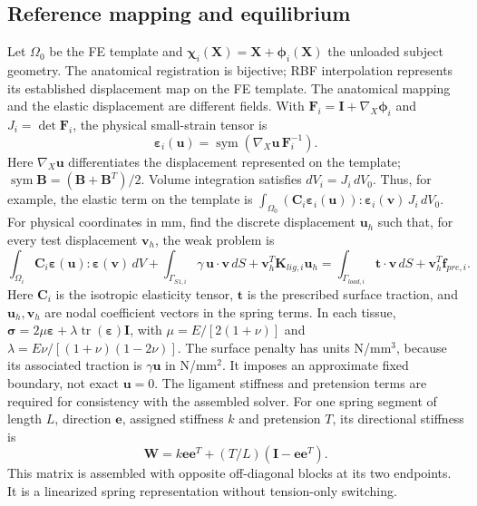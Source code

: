 \subsection{Reference mapping and equilibrium}
Let $\Omega_0$ be the FE template and $\boldsymbol\chi_i(\mathbf X)=\mathbf X+\boldsymbol\phi_i(\mathbf X)$ the unloaded subject geometry. The anatomical registration is bijective; RBF interpolation represents its established displacement map on the FE template. The anatomical mapping and the elastic displacement are different fields. With $\mathbf F_i=\mathbf I+\nabla_X\boldsymbol\phi_i$ and $J_i=\det\mathbf F_i$, the physical small-strain tensor is
\begin{equation}
\boldsymbol\varepsilon_i(\mathbf u)=\operatorname{sym}(\nabla_X\mathbf u\,\mathbf F_i^{-1}).
\end{equation}
Here $\nabla_X\mathbf u$ differentiates the displacement represented on the template; $\operatorname{sym}\mathbf B=(\mathbf B+\mathbf B^T)/2$. Volume integration satisfies $dV_i=J_i\,dV_0$. Thus, for example, the elastic term on the template is $\int_{\Omega_0}(\mathbf C_i\boldsymbol\varepsilon_i(\mathbf u)): \boldsymbol\varepsilon_i(\mathbf v)\,J_i\,dV_0$. For physical coordinates in mm, find the discrete displacement $\mathbf u_h$ such that, for every test displacement $\mathbf v_h$, the weak problem is
\begin{equation}
\int_{\Omega_i}\mathbf C_i\boldsymbol\varepsilon(\mathbf u):\boldsymbol\varepsilon(\mathbf v)\,dV
+\int_{\Gamma_{S1,i}}\gamma\,\mathbf u\cdot\mathbf v\,dS
+\mathbf v_h^T\mathbf K_{lig,i}\mathbf u_h
=\int_{\Gamma_{load,i}}\mathbf t\cdot\mathbf v\,dS+\mathbf v_h^T\mathbf f_{pre,i}.
\end{equation}
Here $\mathbf C_i$ is the isotropic elasticity tensor, $\mathbf t$ is the prescribed surface traction, and $\mathbf u_h,\mathbf v_h$ are nodal coefficient vectors in the spring terms. In each tissue, $\boldsymbol\sigma=2\mu\boldsymbol\varepsilon+\lambda\operatorname{tr}(\boldsymbol\varepsilon)\mathbf I$, with $\mu=E/[2(1+\nu)]$ and $\lambda=E\nu/[(1+\nu)(1-2\nu)]$. The surface penalty has units N/mm$^3$, because its associated traction is $\gamma\mathbf u$ in N/mm$^2$. It imposes an approximate fixed boundary, not exact $\mathbf u=0$. The ligament stiffness and pretension terms are required for consistency with the assembled solver. For one spring segment of length $L$, direction $\mathbf e$, assigned stiffness $k$ and pretension $T$, its directional stiffness is
\begin{equation}
\mathbf W=k\mathbf e\mathbf e^T+(T/L)(\mathbf I-\mathbf e\mathbf e^T).
\end{equation}
This matrix is assembled with opposite off-diagonal blocks at its two endpoints. It is a linearized spring representation without tension-only switching.

